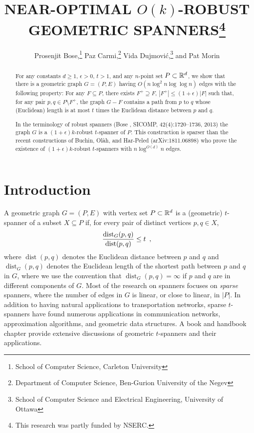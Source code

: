 \documentclass{patmorin}
\title{\MakeUppercase{Near-Optimal }$O(k)$-\MakeUppercase{Robust Geometric Spanners}\thanks{%
This research was partly funded by NSERC.
}}
\author{Prosenjit Bose,\thanks{%
        School of Computer Science, Carleton University}\quad 
        Paz Carmi,\thanks{Department of Computer Science, Ben-Gurion University of the Negev}\quad
        Vida Dujmovi\'c,\thanks{%
        School of Computer Science and Electrical Engineering, University of Ottawa}\quad
        and Pat Morin\footnotemark[2]}
\date{\DTMnow}
\DeclareMathOperator{\dist}{dist}
\begin{document}
\maketitle


\begin{abstract}
  For any constants $d\ge 1$, $\epsilon >0$, $t>1$, and any $n$-point
  set $P\subset\mathbb{R}^d$, we show that there is a geometric graph $G=(P,E)$
  having $O(n\log^2 n\log\log n)$ edges with the following property:
  For any $F\subseteq P$, there exists $F^+\supseteq F$, $|F^+| \le
  (1+\epsilon)|F|$ such that, for any pair $p,q\in P\setminus F^+$,
  the graph $G-F$ contains a path from $p$ to $q$ whose (Euclidean)
  length is at most $t$ times the Euclidean distance between $p$ and $q$.
  
  In the terminology of robust spanners (Bose \etal, SICOMP,
  42(4):1720--1736, 2013) the graph $G$ is a $(1+\epsilon)k$-robust
  $t$-spanner of $P$. This construction is sparser than the recent
  constructions of Buchin, Ol\`ah, and Har-Peled (arXiv:1811.06898)
  who prove the existence of $(1+\epsilon)k$-robust $t$-spanners with
  $n\log^{O(d)} n$ edges.
\end{abstract}

\section{Introduction}

A geometric graph $G=(P,E)$ with vertex set $P\subset\mathbb{R}^d$ is a (geometric)
$t$-spanner of a subset $X\subseteq P$ if, for every pair of distinct vertices
$p,q\in X$, 
\begin{equation}
  \frac{\dist_G(p,q)}{\dist(p,q)} \le t \enspace , \eqlabel{spanning-ratio}
\end{equation}
where $\dist(p,q)$ denotes the Euclidean distance between $p$ and
$q$ and $\dist_G(p,q)$ denotes the Euclidean length of the shortest
path between $p$ and $q$ in $G$, where we use the convention that
$\dist_G(p,q)=\infty$ if $p$ and $q$ are in different components of $G$.
Most of the research on spanners focuses on \emph{sparse} spanners,
where the number of edges in $G$ is linear, or close to linear, in $|P|$.
In addition to having natural applications to transportation networks,
sparse $t$-spanners have found numerous applications in communication
networks, approximation algorithms, and geometric data structures.
A book \cite{ns07} and handbook chapter \cite{e99} provide extensive
discussions of geometric $t$-spanners and their applications.
\end{document}

